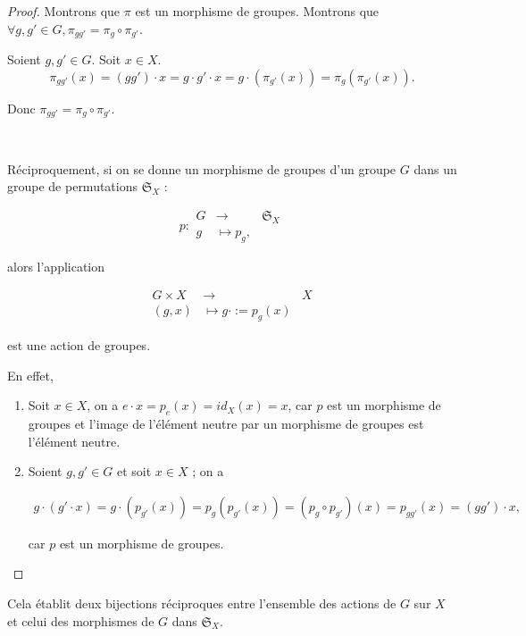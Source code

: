 \documentclass[french]{book}
\theoremstyle{definition}
\theoremstyle{remark}
\begin{document}
\begin{proof}
  Montrons que $\pi$ est un morphisme de groupes. Montrons que $\forall g, g' \in G, \pi _{g g'} = \pi_g \circ \pi _{g'}$.

  Soient $g, g' \in G$. Soit $x \in X$. $$\pi _{ gg'}(x) = (g g') \cdot x = g \cdot g' \cdot x = g \cdot (\pi _{ g'} (x)) = \pi_g (\pi _{ g'}(x)).$$

  Donc $\pi _{ gg'} = \pi_g \circ \pi _{ g'}$.

  \

  Réciproquement, si on se donne un morphisme de groupes d'un groupe $G$ dans un groupe de permutations $\mathfrak{S}_{X} $ :

  \[
  p:
    \begin{array}{rcl}
    G & \longrightarrow & \mathfrak{S}_{X}  \\
    g & \longmapsto p_g,
    \end{array}
  \]

  alors l'application

  \[
    \begin{array}{rcl}
    G \times X & \longrightarrow & X \\
    (g,x) & \longmapsto g \cdot := p_g(x)
    \end{array}
  \]

  est une action de groupes.

  En effet,

  \begin{enumerate}
    \item Soit $x \in X$, on a $e \cdot x = p_e(x) = id_X(x) = x$, car $p$ est un morphisme de groupes et l'image de l'élément neutre par un morphisme de groupes est l'élément neutre.
    \item Soient $g, g' \in G$ et soit $x \in X$ ; on a

    \begin{gather*}
      g \cdot (g' \cdot x) = g \cdot (p _{g'}(x)) = p_g(p _{g'}(x)) = (p_g \circ p _{g'})(x) = p _{gg'}(x) = (gg') \cdot x,
    \end{gather*}

    car $p$ est un morphisme de groupes.
  \end{enumerate}
\end{proof}

Cela établit deux bijections réciproques entre l'ensemble des actions de $G$ sur $X$ et celui des morphismes de $G$ dans $\mathfrak{S}_{X} $.
\end{document}
